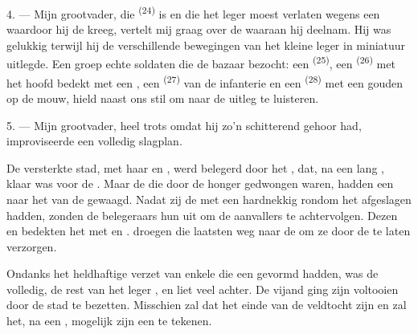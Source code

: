 \VUsaut{4.0mm}
\VUsaut{2.8mm}

4. --- Mijn grootvader, die  \textsuperscript{(24)} is en die het leger moest
verlaten wegens een  waardoor hij de
 kreeg, vertelt mij graag over de 
waaraan hij deelnam. Hij was gelukkig terwijl hij de verschillende bewegingen van het kleine
leger in miniatuur uitlegde. Een groep echte soldaten die de bazaar bezocht: een
 \textsuperscript{(25)}, een
 \textsuperscript{(26)} met het hoofd bedekt met een
, een  \textsuperscript{(27)} van de
infanterie en een  \textsuperscript{(28)} met een gouden
 op de mouw, hield naast ons stil om naar de uitleg te luisteren.

5. --- Mijn grootvader, heel trots omdat hij zo'n schitterend gehoor had, improviseerde een
volledig slagplan.

De versterkte stad, met haar  en , werd belegerd door het
, dat, na een lang , klaar was voor de
. Maar de  die door de honger gedwongen waren, hadden
een  naar het  van de  gewaagd. Nadat zij
de  met een hardnekkig  rondom het 
afgeslagen hadden, zonden de  belegeraars hun  uit om
de
 aanvallers te achtervolgen. Dezen  en bedekten het  met  en
.  droegen die laatsten weg naar de
 om ze door de  te laten verzorgen.

Ondanks het heldhaftige verzet van enkele  die een
 gevormd hadden, was de  volledig, de rest van
het leger , en liet veel  achter. De vijand ging zijn
 voltooien door de stad te bezetten. Misschien zal dat het einde van de
veldtocht zijn en zal het, na een , mogelijk zijn een
 te tekenen.

\VUsaut{4.4mm}
\VUsaut{2.8mm}

